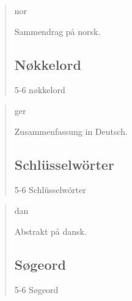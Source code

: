 \documentclass[nomenclature, english, bibtex]{kththesis}
\begin{document}
\cleardoublepage
\begin{abstract}
    \markboth{\abstractname}{}
\begin{scontents}[store-env=lang]
nor
\end{scontents}
\begin{scontents}[store-env=abstracts,print-env=true]
Sammendrag på norsk.
\end{scontents}
\subsection*{Nøkkelord}
\begin{scontents}[store-env=keywords,print-env=true]
5-6 nøkkelord
\end{scontents}
\end{abstract}
\cleardoublepage
\begin{abstract}
    \markboth{\abstractname}{}
\begin{scontents}[store-env=lang]
ger
\end{scontents}
\begin{scontents}[store-env=abstracts,print-env=true]
Zusammenfassung in Deutsch.
\end{scontents}
\subsection*{Schlüsselwörter}
\begin{scontents}[store-env=keywords,print-env=true]
5-6 Schlüsselwörter
\end{scontents}
\end{abstract}
\cleardoublepage
{}
\begin{abstract}
    \markboth{\abstractname}{}
\begin{scontents}[store-env=lang]
dan
\end{scontents}
\begin{scontents}[store-env=abstracts,print-env=true]
Abstrakt på dansk.
\end{scontents}
\subsection*{Søgeord}
\begin{scontents}[store-env=keywords,print-env=true]
5-6 Søgeord
\end{scontents}
\end{abstract}
\end{document}
